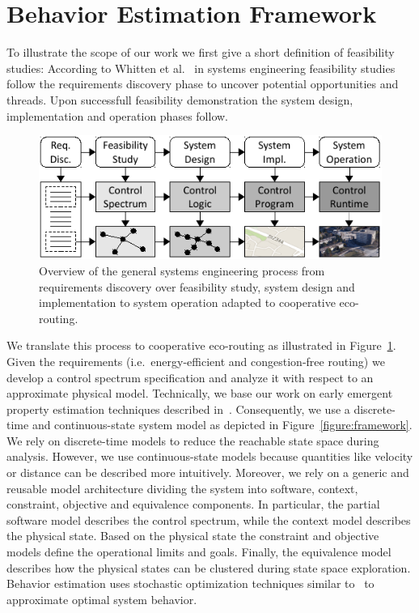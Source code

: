 \documentclass[conference]{../cls/IEEEtran}
\begin{document}
\section{Behavior Estimation Framework}

To illustrate the scope of our work we first give a short definition of feasibility studies: 
According to Whitten et al.~\cite{Whitten2005} in systems engineering feasibility studies follow the requirements discovery phase to uncover potential opportunities and threads.
Upon successfull feasibility demonstration the system design, implementation and operation phases follow.

\begin{figure}[b]
	\centering
	\includegraphics{../gfx/process.pdf}
	\caption{Overview of the general systems engineering process from requirements discovery over feasibility study, system design and implementation to system operation adapted to cooperative eco-routing.}
	\label{figure:process}
\end{figure}
We translate this process to cooperative eco-routing as illustrated in Figure~\ref{figure:process}.
Given the requirements (i.e.\ energy-efficient and congestion-free routing) we develop a control spectrum specification and analyze it with respect to an approximate physical model.
Technically, we base our work on early emergent property estimation techniques described in~\cite{Hackenberg2012}.
Consequently, we use a discrete-time and continuous-state system model as depicted in Figure~\ref{figure:framework}.
We rely on discrete-time models to reduce the reachable state space during analysis.
However, we use continuous-state models because quantities like velocity or distance can be described more intuitively.
Moreover, we rely on a generic and reusable model architecture dividing the system into software, context, constraint, objective and equivalence components.
In particular, the partial software model describes the control spectrum, while the context model describes the physical state.
Based on the physical state the constraint and objective models define the operational limits and goals.
Finally, the equivalence model describes how the physical states can be clustered during state space exploration.
Behavior estimation uses stochastic optimization techniques similar to~\cite{Pereira1991} to approximate optimal system behavior.
\end{document}
